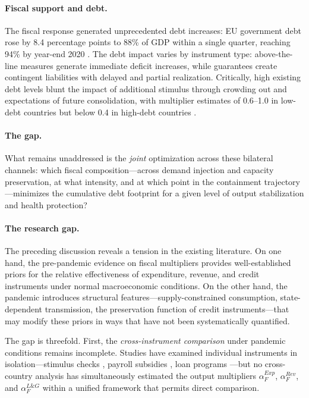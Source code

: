 \paragraph{Fiscal support and debt.} The fiscal response generated
unprecedented debt increases: EU government debt rose by 8.4 percentage
points to 88\% of GDP within a single quarter, reaching 94\% by year-end
2020 \citep{eurostat2021}. The debt impact varies by instrument type:
above-the-line measures generate immediate deficit increases, while
guarantees create contingent liabilities with delayed and partial
realization. Critically, high existing debt levels blunt the impact of
additional stimulus through crowding out and expectations of future
consolidation, with multiplier estimates of 0.6--1.0 in low-debt countries
but below 0.4 in high-debt countries \citep{ilzetzki2013}.

\paragraph{The gap.} What remains unaddressed is the \textit{joint}
optimization across these bilateral channels: which fiscal composition---across
demand injection and capacity preservation, at what intensity, and at which
point in the containment trajectory---minimizes the cumulative debt footprint
for a given level of output stabilization and health protection?





\paragraph{The research gap.}

The preceding discussion reveals a tension in the existing literature. On one hand, the pre-pandemic evidence on fiscal multipliers provides well-established priors for the relative effectiveness of expenditure, revenue, and credit instruments under normal macroeconomic conditions. On the other hand, the pandemic introduces structural features---supply-constrained consumption, state-dependent transmission, the preservation function of credit instruments---that may modify these priors in ways that have not been systematically quantified.

The gap is threefold. First, the \textit{cross-instrument comparison} under pandemic conditions remains incomplete. Studies have examined individual instruments in isolation---stimulus checks \citep{coibion2020, chetty2020, baker2020}, payroll subsidies \citep{aum2021}, loan programs \citep{autor2022, gourinchas2021}---but no cross-country analysis has simultaneously estimated the output multipliers $\alpha_F^{Exp}$, $\alpha_F^{Rev}$, and $\alpha_F^{L\&G}$ within a unified framework that permits direct comparison.

